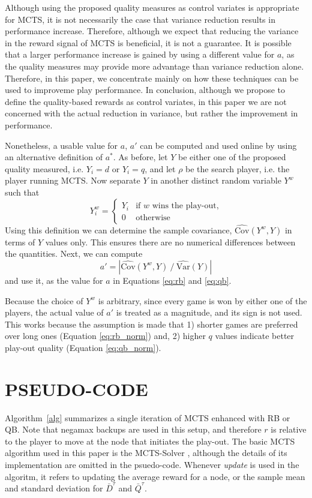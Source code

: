 \documentclass{ecai2014}
\newcommand{\SVar}[1]{\mathrm{\widehat{Var}}\left( #1 \right)}
\newcommand{\SCov}[1]{\mathrm{\widehat{Cov}}\left( #1 \right)}
\begin{document}
Although using the proposed quality measures as control variates is appropriate for MCTS, it is not necessarily the case that variance reduction results in performance increase. Therefore, although we expect that reducing the variance in the reward signal of MCTS is beneficial, it is not a guarantee. It is possible that a larger performance increase is gained by using a different value for $a$, as the quality measures may provide more advantage than variance reduction alone. Therefore, in this paper, we concentrate mainly on how these techniques can be used to improveme play performance. In conclusion, although we propose to define the quality-based rewards as control variates, in this paper we are not concerned with the actual reduction in variance, but rather the improvement in performance.

Nonetheless, a usable value for $a$, $a'$ can be computed and used online by using an alternative definition of $a^*$. As before, let $Y$ be either one of the proposed quality measured, i.e. $Y_i=d$ or $Y_i=q$, and let $\rho$ be the search player, i.e. the player running MCTS. Now separate $Y$ in another distinct random variable $Y^w$ such that
\begin{equation}
Y^w_i =
\begin{cases}
   Y_i & \text{if $w$ wins the play-out,} \\
   0   & \text{otherwise}
\end{cases}
\label{eq:ywin}
\end{equation}
Using this definition we can determine the sample covariance, $\SCov{Y^w,Y}$ in terms of $Y$ values only. This ensures there are no numerical differences between the quantities. Next, we can compute 
\begin{equation}
	a'=\left|{\SCov{Y^w,Y}}\mathbin{/}{\SVar{Y}}\right|
\label{eq:onlinea}
\end{equation}
and use it, as the value for $a$ in Equations \ref{eq:rb} and \ref{eq:qb}. 

Because the choice of $Y^w$ is arbitrary, since every game is won by either one of the players, the actual value of $a'$ is treated as a magnitude, and its sign is not used. This works because the assumption is made that 1) shorter games are preferred over long ones (Equation \ref{eq:rb_norm}) and, 2) higher $q$ values indicate better play-out quality (Equation \ref{eq:qb_norm}).

\section{PSEUDO-CODE}
Algorithm~\ref{alg} summarizes a single iteration of MCTS enhanced with RB or QB. Note that negamax backups are used in this setup, and therefore $r$ is relative to the player to move at the node that initiates the play-out. The basic MCTS algorithm used in this paper is the MCTS-Solver \cite{Winands2008}, although the details of its implementation are omitted in the psuedo-code. Whenever \emph{update} is used in the algoritm, it refers to updating the average reward for a node, or the sample mean and standard deviation for $\bar{D}^\tau$ and $\bar{Q}^\tau$.
\end{document}
